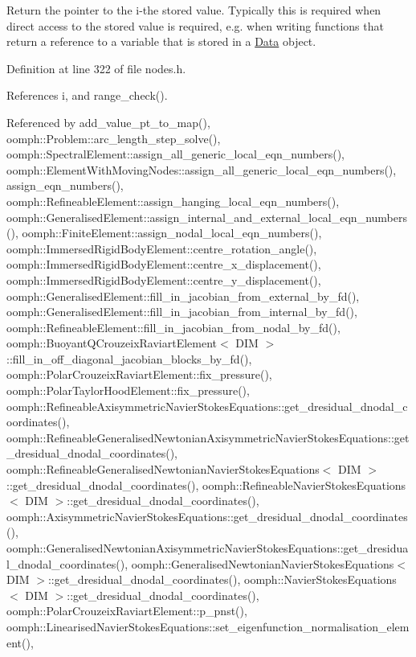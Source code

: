 Return the pointer to the i-\/the stored value. Typically this is required when direct access to the stored value is required, e.\+g. when writing functions that return a reference to a variable that is stored in a \hyperlink{classoomph_1_1Data}{Data} object. 



Definition at line 322 of file nodes.\+h.



References i, and range\+\_\+check().



Referenced by add\+\_\+value\+\_\+pt\+\_\+to\+\_\+map(), oomph\+::\+Problem\+::arc\+\_\+length\+\_\+step\+\_\+solve(), oomph\+::\+Spectral\+Element\+::assign\+\_\+all\+\_\+generic\+\_\+local\+\_\+eqn\+\_\+numbers(), oomph\+::\+Element\+With\+Moving\+Nodes\+::assign\+\_\+all\+\_\+generic\+\_\+local\+\_\+eqn\+\_\+numbers(), assign\+\_\+eqn\+\_\+numbers(), oomph\+::\+Refineable\+Element\+::assign\+\_\+hanging\+\_\+local\+\_\+eqn\+\_\+numbers(), oomph\+::\+Generalised\+Element\+::assign\+\_\+internal\+\_\+and\+\_\+external\+\_\+local\+\_\+eqn\+\_\+numbers(), oomph\+::\+Finite\+Element\+::assign\+\_\+nodal\+\_\+local\+\_\+eqn\+\_\+numbers(), oomph\+::\+Immersed\+Rigid\+Body\+Element\+::centre\+\_\+rotation\+\_\+angle(), oomph\+::\+Immersed\+Rigid\+Body\+Element\+::centre\+\_\+x\+\_\+displacement(), oomph\+::\+Immersed\+Rigid\+Body\+Element\+::centre\+\_\+y\+\_\+displacement(), oomph\+::\+Generalised\+Element\+::fill\+\_\+in\+\_\+jacobian\+\_\+from\+\_\+external\+\_\+by\+\_\+fd(), oomph\+::\+Generalised\+Element\+::fill\+\_\+in\+\_\+jacobian\+\_\+from\+\_\+internal\+\_\+by\+\_\+fd(), oomph\+::\+Refineable\+Element\+::fill\+\_\+in\+\_\+jacobian\+\_\+from\+\_\+nodal\+\_\+by\+\_\+fd(), oomph\+::\+Buoyant\+Q\+Crouzeix\+Raviart\+Element$<$ D\+I\+M $>$\+::fill\+\_\+in\+\_\+off\+\_\+diagonal\+\_\+jacobian\+\_\+blocks\+\_\+by\+\_\+fd(), oomph\+::\+Polar\+Crouzeix\+Raviart\+Element\+::fix\+\_\+pressure(), oomph\+::\+Polar\+Taylor\+Hood\+Element\+::fix\+\_\+pressure(), oomph\+::\+Refineable\+Axisymmetric\+Navier\+Stokes\+Equations\+::get\+\_\+dresidual\+\_\+dnodal\+\_\+coordinates(), oomph\+::\+Refineable\+Generalised\+Newtonian\+Axisymmetric\+Navier\+Stokes\+Equations\+::get\+\_\+dresidual\+\_\+dnodal\+\_\+coordinates(), oomph\+::\+Refineable\+Generalised\+Newtonian\+Navier\+Stokes\+Equations$<$ D\+I\+M $>$\+::get\+\_\+dresidual\+\_\+dnodal\+\_\+coordinates(), oomph\+::\+Refineable\+Navier\+Stokes\+Equations$<$ D\+I\+M $>$\+::get\+\_\+dresidual\+\_\+dnodal\+\_\+coordinates(), oomph\+::\+Axisymmetric\+Navier\+Stokes\+Equations\+::get\+\_\+dresidual\+\_\+dnodal\+\_\+coordinates(), oomph\+::\+Generalised\+Newtonian\+Axisymmetric\+Navier\+Stokes\+Equations\+::get\+\_\+dresidual\+\_\+dnodal\+\_\+coordinates(), oomph\+::\+Generalised\+Newtonian\+Navier\+Stokes\+Equations$<$ D\+I\+M $>$\+::get\+\_\+dresidual\+\_\+dnodal\+\_\+coordinates(), oomph\+::\+Navier\+Stokes\+Equations$<$ D\+I\+M $>$\+::get\+\_\+dresidual\+\_\+dnodal\+\_\+coordinates(), oomph\+::\+Polar\+Crouzeix\+Raviart\+Element\+::p\+\_\+pnst(), oomph\+::\+Linearised\+Navier\+Stokes\+Equations\+::set\+\_\+eigenfunction\+\_\+normalisation\+\_\+element(), 
